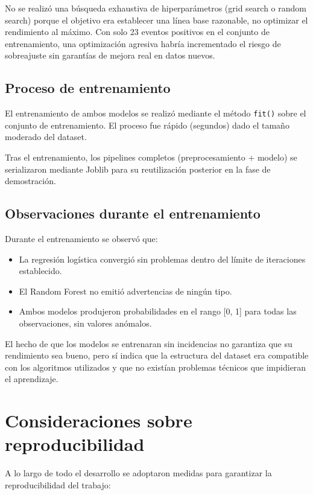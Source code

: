 \documentclass[12pt, a4paper, oneside]{report}
\begin{document}
No se realizó una búsqueda exhaustiva de hiperparámetros (grid search o random search) porque el objetivo era establecer una línea base razonable, no optimizar el rendimiento al máximo. Con solo 23 eventos positivos en el conjunto de entrenamiento, una optimización agresiva habría incrementado el riesgo de sobreajuste sin garantías de mejora real en datos nuevos.

\subsection{Proceso de entrenamiento}

El entrenamiento de ambos modelos se realizó mediante el método \texttt{fit()} sobre el conjunto de entrenamiento. El proceso fue rápido (segundos) dado el tamaño moderado del dataset.

Tras el entrenamiento, los pipelines completos (preprocesamiento + modelo) se serializaron mediante Joblib para su reutilización posterior en la fase de demostración.

\subsection{Observaciones durante el entrenamiento}

Durante el entrenamiento se observó que:

\begin{itemize}
    \item La regresión logística convergió sin problemas dentro del límite de iteraciones establecido.
    \item El Random Forest no emitió advertencias de ningún tipo.
    \item Ambos modelos produjeron probabilidades en el rango [0, 1] para todas las observaciones, sin valores anómalos.
\end{itemize}

El hecho de que los modelos se entrenaran sin incidencias no garantiza que su rendimiento sea bueno, pero sí indica que la estructura del dataset era compatible con los algoritmos utilizados y que no existían problemas técnicos que impidieran el aprendizaje.

\section{Consideraciones sobre reproducibilidad}

A lo largo de todo el desarrollo se adoptaron medidas para garantizar la reproducibilidad del trabajo:
\end{document}
